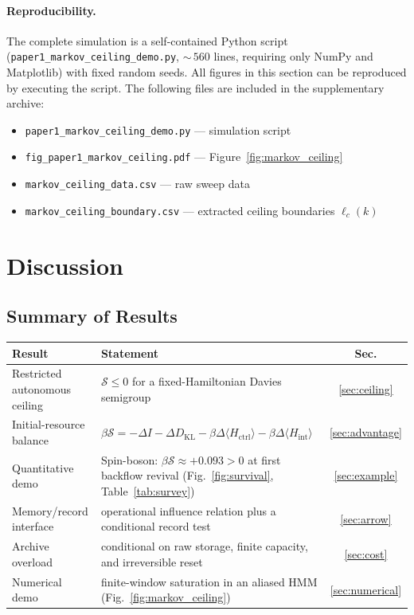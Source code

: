 \documentclass[12pt]{article}
\begin{document}
\paragraph{Reproducibility.}
\begin{sloppypar}
The complete simulation is a self-contained Python script
(\texttt{paper1\_markov\_ceiling\_demo.py}, ${\sim}\,560$
lines, requiring only NumPy and Matplotlib) with fixed
random seeds.  All figures in this section can be
reproduced by executing the script.  The following files
are included in the supplementary archive:
\begin{itemize}
\item \texttt{paper1\_markov\_ceiling\_demo.py} --- simulation script
\item \texttt{fig\_paper1\_markov\_ceiling.pdf} --- Figure~\ref{fig:markov_ceiling}
\item \texttt{markov\_ceiling\_data.csv} --- raw sweep data
\item \texttt{markov\_ceiling\_boundary.csv} --- extracted
  ceiling boundaries $\ell_c(k)$
\end{itemize}
\end{sloppypar}

\section{Discussion}
\label{sec:discussion}

\subsection{Summary of Results}

\begin{center}
\small
\setlength{\tabcolsep}{4pt}%
\begin{tabular}{@{}lP{7.5cm}c@{}}
\toprule
\textbf{Result} & \textbf{Statement} & \textbf{Sec.} \\
\midrule
Restricted autonomous ceiling &
  $\mathcal{S} \leq 0$ for a fixed-Hamiltonian Davies semigroup
  & \ref{sec:ceiling} \\[3pt]
Initial-resource balance &
  $\beta\mathcal{S} = -\Delta I
  - \Delta D_{\mathrm{KL}}
  - \beta\Delta\langle H_{\mathrm{ctrl}}\rangle
  - \beta\Delta\langle H_{\mathrm{int}}\rangle$
  & \ref{sec:advantage} \\[3pt]
Quantitative demo &
  Spin-boson: $\beta\mathcal{S} \approx +0.093 > 0$
  at first backflow revival (Fig.~\ref{fig:survival},
  Table~\ref{tab:survey})
  & \ref{sec:example} \\[3pt]
Memory/record interface &
  operational influence relation plus a conditional record test
  & \ref{sec:arrow} \\[3pt]
Archive overload &
  conditional on raw storage, finite capacity, and irreversible reset
  & \ref{sec:cost} \\[3pt]
Numerical demo &
  finite-window saturation in an aliased HMM
  (Fig.~\ref{fig:markov_ceiling})
  & \ref{sec:numerical} \\
\bottomrule
\end{tabular}
\end{center}
\end{document}
